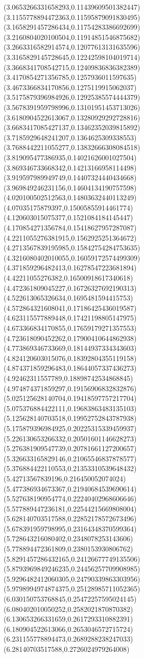 {(3.0653266331658293,0.11439609501382447)
(3.1155778894472363,0.11595879091830495)
(3.1658291457286434,0.11754283386692699)
(3.2160804020100504,0.11914851546875682)
(3.2663316582914574,0.12077613131635596)
(3.3165829145728645,0.12242598104019714)
(3.3668341708542715,0.12409836836382389)
(3.4170854271356785,0.1257936011597635)
(3.4673366834170856,0.1275119915062037)
(3.5175879396984926,0.12925385574444379)
(3.5678391959798996,0.13101951453713026)
(3.6180904522613067,0.13280929292728816)
(3.6683417085427137,0.13462352039815892)
(3.7185929648241207,0.1364625309338553)
(3.7688442211055277,0.13832666308084518)
(3.819095477386935,0.14021626001027504)
(3.869346733668342,0.14213166958114498)
(3.919597989949749,0.14407324440434668)
(3.969849246231156,0.14604134190757598)
(4.020100502512563,0.14803632440113249)
(4.07035175879397,0.15005855914461774)
(4.120603015075377,0.1521084184145447)
(4.170854271356784,0.15418627957287087)
(4.2211055276381915,0.1562925251364672)
(4.2713567839195985,0.15842754284753635)
(4.3216080402010055,0.16059172574499309)
(4.371859296482413,0.16278547223681894)
(4.42211055276382,0.16500918617340618)
(4.472361809045227,0.16726327692190313)
(4.522613065326634,0.1695481594415753)
(4.572864321608041,0.17186425436019587)
(4.623115577889448,0.17421198805147975)
(4.673366834170855,0.17659179271357553)
(4.723618090452262,0.17900410644862938)
(4.773869346733669,0.18144937334343603)
(4.824120603015076,0.18392804355119158)
(4.874371859296483,0.18644057337436273)
(4.92462311557789,0.18898742534868845)
(4.974874371859297,0.19156906832832876)
(5.025125628140704,0.19418597757217704)
(5.075376884422111,0.19683863483135103)
(5.125628140703518,0.19952752843787938)
(5.175879396984925,0.20225315339459937)
(5.226130653266332,0.20501601146628273)
(5.276381909547739,0.20781661127200657)
(5.326633165829146,0.21065546837878577)
(5.376884422110553,0.21353310539648432)
(5.42713567839196,0.216450052074024)
(5.477386934673367,0.21940684539690614)
(5.527638190954774,0.22240402968606646)
(5.577889447236181,0.22544215669808004)
(5.628140703517588,0.22852178572673496)
(5.678391959798995,0.23164348370599364)
(5.728643216080402,0.2348078253143606)
(5.778894472361809,0.2380153930806762)
(5.8291457286432165,0.24126677749135506)
(5.8793969849246235,0.24456257709908985)
(5.9296482412060305,0.24790339863303956)
(5.9798994974874375,0.25128985711052365)
(6.030150753768845,0.25472257595024145)
(6.080402010050252,0.2582021870870382)
(6.130653266331659,0.2617293310882391)
(6.180904522613066,0.2653046572715724)
(6.231155778894473,0.2689288238247033)
(6.28140703517588,0.2726024979264008)
}
